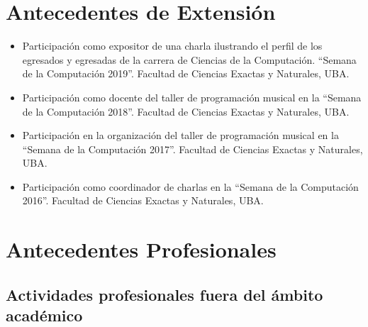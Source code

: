 \documentclass[a4paper,10pt]{article}
\begin{document}
\section{Antecedentes de Extensión}

\begin{itemize}
    \item 
      Participación como expositor de una charla ilustrando el perfil de los
      egresados y egresadas de la carrera de Ciencias
      de la Computación. “Semana de la Computación 2019”.
      Facultad de Ciencias Exactas y Naturales, UBA.
    \item Participación como docente del taller de programación musical en la
        “Semana de la Computación 2018”.
        Facultad de Ciencias Exactas y Naturales, UBA.
    \item Participación en la organización del taller de programación musical
        en la “Semana de la Computación 2017”. Facultad de Ciencias Exactas y
        Naturales, UBA. 
    \item Participación como coordinador de charlas en la “Semana de la
        Computación 2016”. Facultad de Ciencias Exactas y Naturales, UBA. 
\end{itemize}

\section{Antecedentes Profesionales}

\subsection{Actividades profesionales fuera del ámbito académico}
\end{document}
